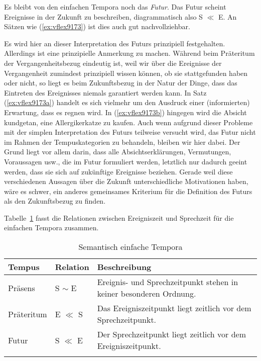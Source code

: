 
Es bleibt von den einfachen Tempora noch das \textit{Futur}.
Das Futur scheint Ereignisse in der Zukunft zu beschreiben, diagrammatisch also S $\ll$ E.
An Sätzen wie (\ref{ex:vflex9173}) ist dies auch gut nachvollziehbar.

\begin{exe}
  \ex\label{ex:vflex9173}
  \begin{xlist}
  \end{xlist}
\end{exe}

Es wird hier an dieser Interpretation des Futurs prinzipiell festgehalten.
Allerdings ist eine prinzipielle Anmerkung zu machen.
Während beim Präteritum der Vergangenheitsbezug eindeutig ist, weil wir über die Ereignisse der Vergangenheit zumindest prinzipiell wissen können, ob sie stattgefunden haben oder nicht, so liegt es beim Zukunftsbezug in der Natur der Dinge, dass das Eintreten des Ereignisses niemals garantiert werden kann.
In Satz (\ref{ex:vflex9173a}) handelt es sich vielmehr um den Ausdruck einer (informierten) Erwartung, dass es regnen wird.
In (\ref{ex:vflex9173b}) hingegen wird die Absicht kundgetan, eine Allergikerkatze zu kaufen.
Auch wenn aufgrund dieser Probleme mit der simplen Interpretation des Futurs teilweise versucht wird, das Futur nicht im Rahmen der Tempuskategorien zu behandeln, bleiben wir hier dabei.
Der Grund liegt vor allem darin, dass alle Absichtserklärungen, Vermutungen, Voraussagen usw., die im Futur formuliert werden, letztlich nur dadurch geeint werden, dass sie sich auf zukünftige Ereignisse beziehen.
Gerade weil diese verschiedenen Aussagen über die Zukunft unterschiedliche Motivationen haben, wäre es schwer, ein anderes gemeinsames Kriterium für die Definition des Futurs als den Zukunftsbezug zu finden.

Tabelle~\ref{tab:simptemp} fasst die Relationen zwischen Ereigniszeit und Sprechzeit für die einfachen Tempora zusammen.

\begin{table}
  \centering
  \begin{tabular}{llp{6cm}}
    \lsptoprule
    \textbf{Tempus} & \textbf{Relation} & \textbf{Beschreibung} \\
    \midrule
    Präsens & S $\sim$ E & Ereignis- und Sprechzeitpunkt stehen in keiner besonderen Ordnung. \\
    Präteritum & E $\ll$ S & Das Ereigniszeitpunkt liegt zeitlich vor dem Sprechzeitpunkt. \\
    Futur & S $\ll$ E & Der Sprechzeitpunkt liegt zeitlich vor dem Ereigniszeitpunkt. \\
    \lspbottomrule
  \end{tabular}
  \caption{Semantisch einfache Tempora}
  \label{tab:simptemp}
\end{table}

